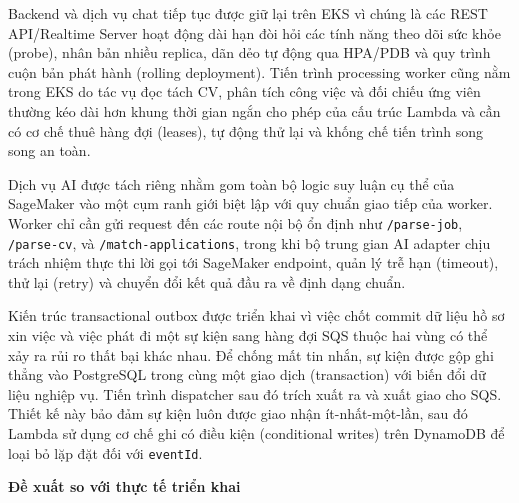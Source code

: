 Backend và dịch vụ chat tiếp tục được giữ lại trên EKS vì chúng là các
REST API/Realtime Server hoạt động dài hạn đòi hỏi các tính năng theo
dõi sức khỏe (probe), nhân bản nhiều replica, dãn dẻo tự động qua
HPA/PDB và quy trình cuộn bản phát hành (rolling deployment). Tiến trình
processing worker cũng nằm trong EKS do tác vụ đọc tách CV, phân tích
công việc và đối chiếu ứng viên thường kéo dài hơn khung thời gian ngắn
cho phép của cấu trúc Lambda và cần có cơ chế thuê hàng đợi (leases), tự
động thử lại và khống chế tiến trình song song an toàn.

Dịch vụ AI được tách riêng nhằm gom toàn bộ logic suy luận cụ thể của
SageMaker vào một cụm ranh giới biệt lập với quy chuẩn giao tiếp của
worker. Worker chỉ cần gửi request đến các route nội bộ ổn định như
\texttt{/\allowbreak{}parse-\allowbreak{}job}, \texttt{/\allowbreak{}parse-\allowbreak{}cv}, và
\texttt{/\allowbreak{}match-\allowbreak{}applications}, trong khi bộ trung gian AI adapter chịu
trách nhiệm thực thi lời gọi tới SageMaker endpoint, quản lý trễ hạn
(timeout), thử lại (retry) và chuyển đổi kết quả đầu ra về định dạng
chuẩn.

Kiến trúc transactional outbox được triển khai vì việc chốt commit dữ
liệu hồ sơ xin việc và việc phát đi một sự kiện sang hàng đợi SQS thuộc
hai vùng có thể xảy ra rủi ro thất bại khác nhau. Để chống mất tin nhắn,
sự kiện được gộp ghi thẳng vào PostgreSQL trong cùng một giao dịch
(transaction) với biến đổi dữ liệu nghiệp vụ. Tiến trình dispatcher sau
đó trích xuất ra và xuất giao cho SQS. Thiết kế này bảo đảm sự kiện luôn
được giao nhận ít-nhất-một-lần, sau đó Lambda sử dụng cơ chế ghi có điều
kiện (conditional writes) trên DynamoDB để loại bỏ lặp đặt đối với
\texttt{eventId}.

\vspace{0.5em}\noindent\textbf{Đề xuất so với thực tế triển
khai}\par

